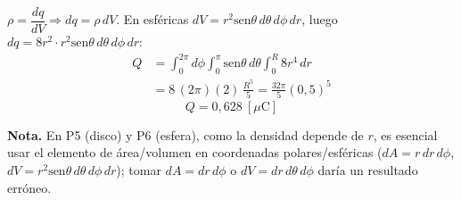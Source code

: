 \documentclass[12pt,letterpaper]{article}
\begin{document}
\noindent
\begin{minipage}[t]{0.30\textwidth}
\centering\vspace{2pt}
\end{minipage}%
\hfill
\begin{minipage}[t]{0.66\textwidth}
\vspace{0pt}
$\rho=\dfrac{dq}{dV}\Rightarrow dq=\rho\,dV$. En esf\'ericas $dV=r^{2}\text{sen}\theta\,d\theta\,d\phi\,dr$,
luego $dq=8r^{2}\cdot r^{2}\text{sen}\theta\,d\theta\,d\phi\,dr$:
\begin{align*}
    Q &= \int_0^{2\pi}\!\!d\phi\int_0^{\pi}\!\text{sen}\theta\,d\theta\int_0^{R}\!8r^{4}\,dr\\[2pt]
      &= 8\,(2\pi)(2)\,\frac{R^{5}}{5} = \frac{32\pi}{5}(0{,}5)^{5}
\end{align*}
\[
    \boxed{Q = 0{,}628\ [\mu\text{C}]}
\]
\end{minipage}

\vspace{0.5cm}
\noindent\small\textbf{Nota.} En P5 (disco) y P6 (esfera), como la densidad depende de $r$, es esencial
usar el elemento de \'area/volumen en coordenadas polares/esf\'ericas ($dA=r\,dr\,d\phi$,
$dV=r^{2}\text{sen}\theta\,d\theta\,d\phi\,dr$); tomar $dA=dr\,d\phi$ o $dV=dr\,d\theta\,d\phi$ dar\'ia
un resultado err\'oneo.\normalsize
\end{document}
